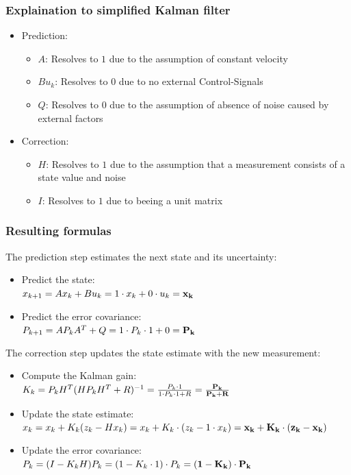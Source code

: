 \documentclass[aspectratio=169]{beamer}
\begin{document}
\begin{frame}
    \frametitle{Explaination to simplified Kalman filter}

    \begin{itemize}
        \item Prediction:
              \begin{itemize}
                  \item{\(A\): Resolves to \(1\) due to the assumption of constant velocity}
                  \item{\(Bu_{k}\): Resolves to \(0\) due to no external Control-Signals}
                  \item{\(Q\): Resolves to \(0\) due to the assumption of absence of noise caused by external factors}
              \end{itemize}
        \item Correction:
              \begin{itemize}
                  \item{\(H\): Resolves to \(1\) due to the assumption that a measurement consists of a state value and noise}
                  \item{\(I\): Resolves to \(1\) due to beeing a unit matrix}
              \end{itemize}
    \end{itemize}

\end{frame}

\begin{frame}
    \frametitle{Resulting formulas}

    The prediction step estimates the next state and its uncertainty:

    \begin{itemize}
        \item Predict the state: \\
              \(x_{k+1}=Ax_{k} + Bu_{k}=1 \cdot x_{k} + 0 \cdot u_{k} = \bf{x_{k}}\)
        \item Predict the error covariance: \\
              \(P_{k+1}=AP_{k}A^{T}+Q=1 \cdot P_{k} \cdot 1 + 0 = \bf{P_{k}}\)
    \end{itemize}

    The correction step updates the state estimate with the new measurement:
    \begin{itemize}
        \item Compute the Kalman gain: \\
              \(K_{k} = P_{k}H^{T}(HP_{k}H^{T}+R)^{-1} = \frac{P_{k} \cdot 1} {1 \cdot P_{k} \cdot 1 + R} = \bf{\frac{P_{k}} {P_{k} + R}}\)
        \item Update the state estimate: \\
              \(x_{k} = x_{k} + K_{k}(z_{k} - Hx_{k}) = x_{k} + K_{k} \cdot (z_{k} - 1 \cdot x_{k}) = \bf{x_{k} + K_{k} \cdot (z_{k} - x_{k})}\)
        \item Update the error covariance: \\
              \(P_{k} = (I - K_{k}H)P_{k} = (1 - K_{k} \cdot 1) \cdot P_{k} = \bf{(1 - K_{k}) \cdot P_{k}}\)
    \end{itemize}
\end{frame}
\end{document}
